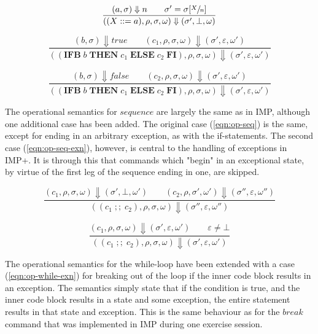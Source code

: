 \begin{equation}\label{eqn:op-assign}
\frac{(a, \sigma) \Downarrow n \qquad \sigma' = \sigma[\sfrac{X}{n}]}{((X ::= a), \rho, \sigma, \omega) \Downarrow (\sigma', \bot, \omega)}
\end{equation}

\begin{equation}
\frac{(b, \sigma) \Downarrow true \qquad (c_1, \rho, \sigma, \omega) \Downarrow (\sigma', \varepsilon, \omega')}{((\textbf{IFB}\; b\; \textbf{THEN}\; c_1\; \textbf{ELSE}\; c_2\; \textbf{FI}), \rho, \sigma, \omega) \Downarrow (\sigma', \varepsilon, \omega')}
\end{equation}

\begin{equation}
\frac{(b, \sigma) \Downarrow false \qquad (c_2, \rho, \sigma, \omega) \Downarrow (\sigma', \varepsilon, \omega')}{((\textbf{IFB}\; b\; \textbf{THEN}\; c_1\; \textbf{ELSE}\; c_2\; \textbf{FI}), \rho, \sigma, \omega) \Downarrow (\sigma', \varepsilon, \omega')}
\end{equation}

The operational semantics for $sequence$ are largely the same as in IMP, although one additional case has been added. The original case (\ref{eqn:op-seq}) is the same, except for ending in an arbitrary exception, as with the if-statements. The second case (\ref{eqn:op-seq-exn}), however, is central to the handling of exceptions in IMP+. It is through this that commands which "begin" in an exceptional state, by virtue of the first leg of the sequence ending in one, are skipped.

\begin{equation}\label{eqn:op-seq}
\frac{(c_1, \rho, \sigma, \omega) \Downarrow (\sigma', \bot, \omega') \qquad (c_2, \rho, \sigma', \omega') \Downarrow (\sigma'', \varepsilon, \omega'')}{((c_1\; ;;\; c_2), \rho, \sigma, \omega) \Downarrow (\sigma'', \varepsilon, \omega'')}
\end{equation}

\begin{equation}\label{eqn:op-seq-exn}
\frac{(c_1, \rho, \sigma, \omega) \Downarrow (\sigma', \varepsilon, \omega') \qquad \varepsilon \neq \bot}{((c_1\; ;;\; c_2), \rho, \sigma, \omega) \Downarrow (\sigma', \varepsilon, \omega')}
\end{equation}

The operational semantics for the while-loop have been extended with a case (\ref{eqn:op-while-exn}) for breaking out of the loop if the inner code block results in an exception. The semantics simply state that if the condition is true, and the inner code block results in a state and some exception, the entire statement results in that state and exception. This is the same behaviour as for the $break$ command that was implemented in IMP during one exercise session.

